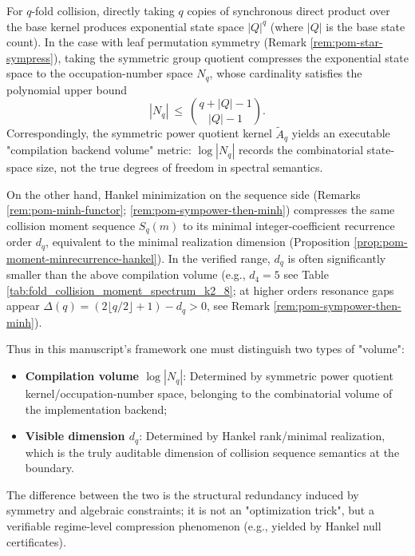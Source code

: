 
\begin{remark}\label{rem:pom-compile-volume-vs-visible-dimension}
For \(q\)-fold collision, directly taking \(q\) copies of synchronous direct product over the base kernel produces exponential state space \(|Q|^q\) (where \(|Q|\) is the base state count).
In the case with leaf permutation symmetry (Remark \ref{rem:pom-star-sympress}), taking the symmetric group quotient compresses the exponential state space to the occupation-number space \(N_q\), whose cardinality satisfies the polynomial upper bound
\[
|N_q|\ \le\ \binom{q+|Q|-1}{|Q|-1}.
\]
Correspondingly, the symmetric power quotient kernel \(\widetilde A_q\) yields an executable "compilation backend volume" metric: \(\log|N_q|\) records the combinatorial state-space size, not the true degrees of freedom in spectral semantics.
\par
On the other hand, Hankel minimization on the sequence side (Remarks \ref{rem:pom-minh-functor}; \ref{rem:pom-sympower-then-minh}) compresses the same collision moment sequence \(S_q(m)\) to its minimal integer-coefficient recurrence order \(d_q\), equivalent to the minimal realization dimension (Proposition \ref{prop:pom-moment-minrecurrence-hankel}).
In the verified range, \(d_q\) is often significantly smaller than the above compilation volume (e.g., \(d_4=5\) see Table \ref{tab:fold_collision_moment_spectrum_k2_8}; at higher orders resonance gaps appear \(\Delta(q)=(2\lfloor q/2\rfloor+1)-d_q>0\), see Remark \ref{rem:pom-sympower-then-minh}).
\par
Thus in this manuscript's framework one must distinguish two types of "volume":
\begin{itemize}
  \item \textbf{Compilation volume \(\log|N_q|\)}: Determined by symmetric power quotient kernel/occupation-number space, belonging to the combinatorial volume of the implementation backend;
  \item \textbf{Visible dimension \(d_q\)}: Determined by Hankel rank/minimal realization, which is the truly auditable dimension of collision sequence semantics at the boundary.
\end{itemize}
The difference between the two is the structural redundancy induced by symmetry and algebraic constraints; it is not an "optimization trick", but a verifiable regime-level compression phenomenon (e.g., yielded by Hankel null certificates).
\end{remark}


